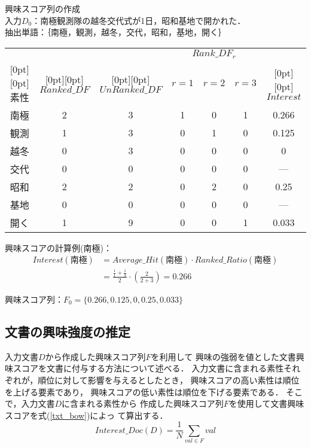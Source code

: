 \documentclass[japanese]{jnlp_1.4}
\newcounter{ex}
\def\ex#1{}
\begin{document}
\vspace{0.5\baselineskip}
\begin{itembox}{\ex{}\label{chasenex2}興味スコア列の作成\\}
入力$D_0$：南極観測隊の越冬交代式が1日，昭和基地で開かれた．\\
抽出単語：｛南極，観測，越冬，交代，昭和，基地，開く｝\\[-0.5zw]
{\small
\begin{center}
\begin{tabular}{c||c|c|c|c|c|c}\hline
&&& \multicolumn{3}{c|}{$Rank\_DF_{r}$}\\ \cline{4-6}
\raisebox{0.5\normalbaselineskip}[0pt][0pt]{素性}& \raisebox{0.5\normalbaselineskip}[0pt][0pt]{$Ranked\_DF$}&\raisebox{0.5\normalbaselineskip}[0pt][0pt]{$UnRanked\_DF$}&$r=1$&${r=2}$&${r=3}$&\raisebox{0.5\normalbaselineskip}[0pt][0pt]{$Interest$}\\
\hline
南極&2&3&1&0&1&0.266\\
観測&1&3&0&1&0&0.125\\
越冬&0&3&0&0&0&0\\
交代&0&0&0&0&0&--- \\
昭和&2&2&0&2&0&0.25\\
基地&0&0&0&0&0&--- \\
開く&1&9&0&0&1&0.033\\
\hline
\end{tabular}
\end{center}}\par\vspace{0.5zw}
興味スコアの計算例(南極)：
\begin{align*}
\mathit{Interest}(南極) & = Average\_Hit(南極) \cdot Ranked\_Ratio(南極) \\
 & = \frac {\frac{1}{1}+\frac{1}{3}}{2} \cdot \left(\frac{2}{2+3}\right) = 0.266
\end{align*}

興味スコア列：$ F_0=\{0.266,0.125,0,0.25,0.033\}$
\end{itembox}



\subsection{文書の興味強度の推定}

入力文書$D$から作成した興味スコア列$F$を利用して
興味の強弱を値とした文書興味スコアを文書に付与する方法について述べる．
入力文書に含まれる素性それぞれが，順位に対して影響を与えるとしたとき，
興味スコアの高い素性は順位を上げる要素であり，
興味スコアの低い素性は順位を下げる要素である．
そこで，入力文書$D$に含まれる素性から
作成した興味スコア列$F$を使用して文書興味スコアを式(\ref{txt_bow})によっ
て算出する．
\begin{equation} \label{txt_bow}
 Interest\_Doc(D) =  \frac{1}{N}{\sum_{val \in F} val }
\end{equation}
\end{document}
